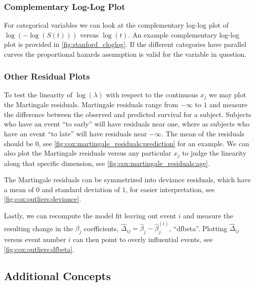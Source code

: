 \subsubsection{Complementary Log-Log Plot}
\label{additional:Survival:assumptions:cloglog}

For categorical variables we can look at the
complementary log-log plot
of $\log\left(-\log\left(S\left(t\right)\right)\right)$ versus $\log\left(t\right)$.
An example complementary log-log plot is provided in \cref{fig:stanford_cloglog}.
If the different categories have parallel curves
the proportional hazards assumption is
valid for the variable in question.

\subsubsection{Other Residual Plots}
\label{additional:Survival:assumptions:linearity}

To test the linearity of $\log\left(\lambda\right)$ with respect to the continuous $x_{j}$
we may plot the Martingale residuals.
Martingale residuals range from $-\infty$ to $1$
and measure the difference between the observed and predicted survival for a subject.
Subjects who have an event ``to early'' will have residuals near one,
where as subjects who have an event ``to late'' will have residuals near $-\infty$.
The mean of the residuals should be $0$, see \cref{fig:cox:martingale_residuals:prediction} for an example.
We can also plot the Martingale residuals versus any particular $x_{j}$
to judge the linearity along that specific dimension, see \cref{fig:cox:martingale_residuals:age}.

The Martingale residuals can be symmetrized into deviance residuals,
which have a mean of $0$ and standard deviation of $1$,
for easier interpretation, see \cref{fig:cox:outliers:deviance}.

Lastly, we can recompute the model fit leaving out event $i$
and measure the resulting change in the $\beta_{j}$ coefficients,
$\hat{\Delta}_{ij} = \hat{\beta}_{j} - \hat{\beta}_{j}^{\left(i\right)}$, \ie ``dfbeta''.
Plotting $\hat{\Delta}_{ij}$ versus event number $i$
can then point to overly influential events, see \cref{fig:cox:outliers:dfbeta}.

\subsection{Additional Concepts}
\label{additional:Survival:additional}

